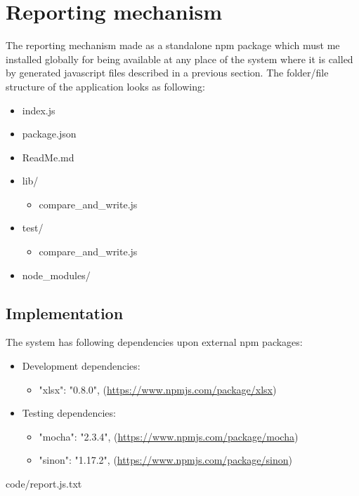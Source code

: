 \section{Reporting mechanism}
\label{sec:report}
The reporting mechanism made as a standalone npm package which must me installed globally for being available at any place of the system where it is called by generated javascript files described in a previous section. 
The folder/file structure of the application looks as following:
\begin{itemize}
	\item index.js
	\item package.json
	\item ReadMe.md
	\item lib/
	\begin{itemize}
		\item compare\_and\_write.js
	\end{itemize}
	\item test/
	\begin{itemize}
		\item compare\_and\_write.js
	\end{itemize}
	\item node\_modules/
\end{itemize}

\subsection{Implementation}
The system has following dependencies upon external npm packages:
\begin{itemize}
	\item Development dependencies:
	\begin{itemize}
		\item "xlsx": "0.8.0", (\url{https://www.npmjs.com/package/xlsx})
	\end{itemize}
	\item Testing dependencies:
	\begin{itemize}
		\item "mocha": "2.3.4", (\url{https://www.npmjs.com/package/mocha})
		\item "sinon": "1.17.2", (\url{https://www.npmjs.com/package/sinon})
	\end{itemize}
\end{itemize}
	


{code/report.js.txt}

